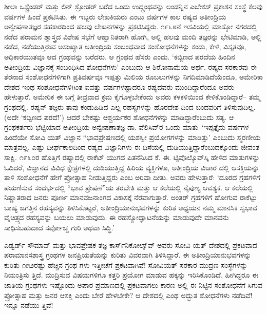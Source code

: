 ಶೀಲಾ ಒಸ್ಟ್ರೆಂಡರ್ ಮತ್ತು ಲಿನ್ ಶ್ರೋಡರ್ ಬರೆದ ಒಂದು ಉದ್ಗ್ರಂಥವನ್ನು ಲಂಡನ್ನಿನ ಎಬೇಕಸ್ ಪ್ರಕಾಶನ ಸಂಸ್ಥೆ ಕೆಲವು ವರ್ಷಗಳ ಹಿಂದೆ ಪ್ರಕಟಿಸಿತು. ಈ ಇಬ್ಬರು ಲೇಖಕಿಯರು ಎಂಟು ವರ್ಷಗಳ ಕಾಲ ರಷ್ಯದ ಅತೀಂದ್ರಿಯ ಅನ್ವೇಷಣಾತಜ್ಞರ ಸಹಕಾರದಿಂದ ಹಲವು ಲೇಖನಗಳನ್ನು ಪ್ರಕಟಿಸಿದ್ದರು. ೧೯೬೮ನೆ ಇಸವಿಯಲ್ಲಿ ಮಾಸ್ಕೋ ನಗರದಲ್ಲಿ ನಡೆದ ಪರಾಮನ ಶ್ಶಾಸ್ತ್ರದ ವಿಶೇಷ ಸಭೆಗೆ ಆಹ್ವಾನಿತರಾಗಿ ಹೋಗಿ, ಅಲ್ಲಿ ಹಲವು ಮಂದಿ ತಜ್ಞರನ್ನು ಭೇಟಿಮಾಡಿ, ಅಲ್ಲಿ ನಡೆದ, ನಡೆಯುತ್ತಿರುವ ಅಸಂಖ್ಯಾತ ಅತೀಂದ್ರಿಯ ಸಂಬಂಧವಾದ ಸಂಶೋಧನೆಗಳನ್ನು ಕಂಡು, ಕೇಳಿ, ವಿಸ್ತೃತವೂ, ಅಧಿಕಾರಯುತವೂ ಆದ ಗ್ರಂಥವನ್ನು ಬರೆದರು. ಆ ಗ್ರಂಥದ ಹೆಸರು  ಎಂದು. ‘ಕಬ್ಬಿಣದ ಪರದೆಯ ಹಿಂದಿನ ಅತೀಂದ್ರಿಯ ವಿಜ್ಞಾನಕ್ಕೆ ಸಂಬಂಧಿಸಿದ ಶೋಧನೆಗಳು’ ಎಂಬುದು ಆ ಶಿರೋನಾಮೆಯ ಅರ್ಥ. ರಷ್ಯದ ಸರಕಾರವು ಈ ತೆರನಾದ ಸಂಶೋಧನೆಗಳಿಗಾಗಿ ಪ್ರತಿವರ್ಷವೂ ಇಪ್ಪತ್ತು ಮಿಲಿಯ ರೂಬಲುಗಳನ್ನು ನಿಗದಿಮಾಡಿದೆಯೆಂದೂ, ಅಮೇರಿಕಾ ದೇಶದ ಇಂಥ ಸಂಶೋಧನೆಗಳಿಗಿಂತ ಐವತ್ತು ವರ್ಷಗಳಷ್ಟಾದರೂ ರಷ್ಯದವರು ಮುಂದಿದ್ದಾರೆಂದೂ ಅವರು ಹೇಳುತ್ತಾರೆ. ಅಮೇರಿಕ ಈ ಬಗ್ಗೆ ತೀವ್ರವಾದ ಕ್ರಮ ಕೈಗೊಳ್ಳಬೇಕೆಂದು ಅವರು ಕಳಕಳಿಯಿಂದ ಕೇಳಿಕೊಂಡಿದ್ದಾರೆ– ತಮ್ಮ ಗ್ರಂಥದಲ್ಲಿ. ರಷ್ಯನ್ ತಜ್ಞರು ತಾವು ಕಂಡುಹಿಡಿದ ಎಲ್ಲ ರಹಸ್ಯಗಳನ್ನು ಹೊರದೇಶ ದಿಂದ ಬಂದವರಿಗೆ ತಿಳಿಸುವುದಿಲ್ಲ. (ಅದೇ ‘ಕಬ್ಬಿಣದ ಪರದೆ!’) ಆದರೆ ಬೇಕಷ್ಟು ಆಶ್ಚರ್ಯಕರ ಶೋಧನೆಗಳನ್ನು ಮಾಡಿದ್ದಾರೆಂಬುದು ಸತ್ಯ. ಆ ಗ್ರಂಥಕರ್ತರು ಭೆಟ್ಟಿಯಾದ ಅತೀಂದ್ರಿಯ ಅನ್ವೇಷಣಾತಜ್ಞ ಡಾ. ವೆಲಿಸಿವ್​ರ ಒಂದು ಮಾತು–‘ಇಪ್ಪತ್ತೈದು ವರ್ಷಗಳ ಹಿಂದೆಯೇ ಸೋವಿ ಯತ್ ವಿಜ್ಞಾನ “ಭಾವಪ್ರೇಷಣದಲ್ಲಿ ಯಶಸ್ವೀ ಪ್ರಯೋಗಗಳನ್ನು ಮಾಡಿತ್ತು’ ಎಂಬುದು ಸ್ಮರಣೀಯ ಮಾತ್ರವಲ್ಲ, ಎಷ್ಟು ದೀರ್ಘಕಾಲದಿಂದ ರಷ್ಯದ ವಿಜ್ಞಾನಿಗಳು ಈ ದಿಸೆಯಲ್ಲಿ ದುಡಿಯುತ್ತಿದ್ದಾರೆಂಬುದಕ್ಕೊಂದು ಜೀವಂತ ಸಾಕ್ಷಿ. ೧೯೩೦ರ ಹೊತ್ತಿಗೆ ರಷ್ಯಾದಲ್ಲಿ ರಾಕೆಟ್ ಯುಗದ ಪಿತನೆನಿಸಿದ ಕೆ. ಈ. ಟ್ಸಿವೊಲ್ಕೊವ್​ಸ್ಕಿ ಹೇಳಿದ ಮಾತುಗಳನ್ನು ಓದಿದರೆ, ವಿಜ್ಞಾನದ ವಿವಿಧ ಕ್ಷೇತ್ರಗಳಲ್ಲಿ ದುಡಿಯುತ್ತಿದ್ದ ಹಿರಿಯ ವ್ಯಕ್ತಿಗಳೂ, ಅತೀಂದ್ರಿಯ ವಿಚಾರ ದಲ್ಲಿ ಆಸಕ್ತಿಯನ್ನು ತಾಳಿ ಸಂಶೋಧನೆಗೆ ಹೇಗೆ ಪ್ರೋತ್ಸಾಹ ನೀಡುತ್ತಿದ್ದರು ಎಂಬ ಅರಿವಾ ದೀತು. ಅವರು ಹೇಳುತ್ತಾರೆ: ‘ದೂರದ ಗ್ರಹಗಳಿಗೆ ಪಯಣಿಸುವ ಸಂದರ್ಭದಲ್ಲಿ “ಭಾವ ಪ್ರೇಷಣೆ”ಯ ತರಬೇತಿ ಮತ್ತು ಆ ಕಲೆಯಲ್ಲಿ ನೈಪುಣ್ಯ ಆವಶ್ಯಕ. ಆ ಕಲೆಯಲ್ಲಿ ನಿಷ್ಣಾತರಾದ ಜನರು ಪೂರ್ಣ ಮಾನವಜನಾಂಗದ ವಿಕಾಸಕ್ಕೆ ನೆರವಾಗುತ್ತಾರೆ. ಅಂತರ್ ಗ್ರಹಗಳಿಗೆ ಹೋಗುವ ರಾಕೆಟ್ಟು ಬಾಹ್ಯ ಜಗತ್ತಿನ ರಹಸ್ಯವನ್ನು ತಿಳಿಸಿಕೊಟ್ಟರೆ, ಅತೀಂದ್ರಿಯಾನುಭವಗಳನ್ನು ಕುರಿತ ಅಧ್ಯಯನ ನಮ್ಮ ಮಾನಸಿಕ ಸ್ವಭಾವ ವೈಚಿತ್ರ್ಯದ ರಹಸ್ಯವನ್ನು ಬಯಲು ಮಾಡುವುದು. ಈ ರಹಸ್ಯೋದ್ಘಾಟನೆಯನ್ನು ಮಾಡುವುದೇ ಮಾನವನು ಸಾಧಿಸಬಹುದಾದ ಸರ್ವೋಚ್ಚ ಗುರಿ ಅಥವಾ ಸಿದ್ಧಿ.’

ಎಡ್ವರ್ಡ್ ಸೌಮಾವ್ ಮತ್ತು ಭಾವಪ್ರೇಷಕ ತಜ್ಞ ಕಾರ್ಸ್​ನಿಕೋಲಾೈವ್ ಅವರು ಸೋವಿ ಯತ್ ದೇಶದಲ್ಲಿ ಪ್ರಕಟವಾದ ಪರಾಮಾನಸಶಾಸ್ತ್ರ ಗ್ರಂಥಗಳ ಜನಪ್ರಿಯತೆಯನ್ನು ಕುರಿತು ವಿವರವಾಗಿ ತಿಳಿಸಿದ್ದಾರೆ. ಈ ಅತೀಂದ್ರಿಯಾನುಭವಗಳನ್ನು ಕುರಿತು ೧೫೨ರಷ್ಟು ಹೆಚ್ಚಿನ ಗ್ರಂಥ ಗಳು ಇತ್ತೀಚೆಗೆ ಪ್ರಕಟವಾಗಿವೆ! ಸೋವಿಯತ್ ಸರಕಾರ ಮುದ್ರಣ ಸಂಸ್ಥೆಗಳನ್ನು ನಿಯಂತ್ರಿಸು ತ್ತಿದೆ. ಮುದ್ರಿಸುವ ವಿಷಯಗಳಿಗೂ ಕತ್ತರಿ ಪ್ರಯೋಗ ಮಾಡುವ ಹಕ್ಕನ್ನು ಇರಿಸಿಕೊಂಡಿದೆ. ಹೀಗಿದ್ದರೂ ಈ ಜಾತಿಯ ಗ್ರಂಥಗಳು ಇಷ್ಟೊಂದು ಅಪಾರ ಪ್ರಮಾಣದಲ್ಲಿ ಪ್ರಕಟವಾಗಲು ಕಾರಣ ಅಲ್ಲಿ ಈ ನಿಟ್ಟಿನ ಸಂಶೋಧನೆಗೆ ಸಿಗುವ ಪ್ರೋತ್ಸಾಹ ಮತ್ತು ಜನರ ಆಸಕ್ತಿ ಎಂದು ಬೇರೆ ಹೇಳಬೇಕೇ? ಆ ದೇಶದಲ್ಲಿ ಎಂಥ ಅದ್ಭುತ ಶೋಧನೆಗಳು ನಡೆದಿವೆ! ಇನ್ನೂ ನಡೆಯು ತ್ತಿವೆ!


